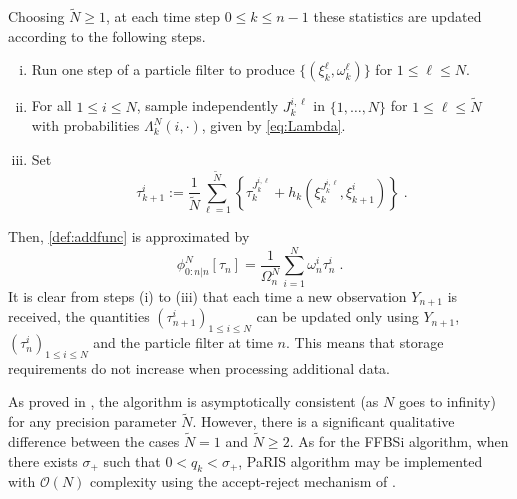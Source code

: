 \documentclass[12pt]{article}
\newcommand{\eqsp}{\;}
\newcommand{\1}{\mathrm{1}}
\newcommand{\qk}{q_{k}}
\begin{document}
Choosing $\tilde{N}\ge 1$, at each time step $0\le k \le {n-1}$ these statistics are updated according to the following steps.
\begin{enumerate}[(i)]
\item \label{it:PaRIS:filt} Run one step of a particle filter to produce $\{(\xi^{\ell}_k, \omega^{\ell}_k)\}$ for $1\le \ell \le N$.
\item \label{it:PaRIS:sampleindex} For all $1\le i \le N$, sample independently $J_{k}^{i,\ell}$ in $\{1,\ldots,N\}$ for $1\le \ell \le \widetilde N$ with probabilities $\Lambda_{k}^N(i,\cdot)$, given by \eqref{eq:Lambda}.
\item \label{it:PaRIS:smooth} Set
\[
\tau^{i}_{k+1} := \frac{1}{\widetilde{N}} \sum^{\widetilde{N}}_{\ell=1} \left\{ \tau^{J_{k}^{i,\ell}}_{k} + h_{k} \left(\xi^{J_{k}^{i,\ell}}_{k}, \xi^{i}_{k+1}\right)  \right\}\eqsp.
\]
\end{enumerate}
Then, \eqref{def:addfunc} is approximated by
\[
\phi_{0:n\vert n}^N[\tau_n] = \frac{1}{\Omega_n^N}\sum_{i=1}^N \omega^{i}_n \tau_n^i\eqsp.
\] 
It is clear from steps (i) to (iii) that each time a new observation $Y_{n+1}$ is received, the quantities $(\tau_{n+1}^i)_{1\le i \le N}$ can be updated only using $Y_{n+1}$, $(\tau_n^i)_{1\le i \le N}$ and the particle filter at time $n$. This means that storage requirements do not increase when processing additional data.

As proved in \cite{olsson:westerborn:2016}, the algorithm is asymptotically consistent (as $N$ goes to infinity) for any precision parameter $\tilde N$. 
However, there is a significant qualitative difference between the cases $\tilde{N} = 1$ and $\tilde{N} \geq 2$. 
As for the FFBSi algorithm,  when there exists $\sigma_+$ such that $0<\qk <\sigma_+$, PaRIS algorithm may be implemented with $\mathcal{O}(N)$ complexity using the accept-reject mechanism of \cite{douc:garivier:moulines:olsson:2011}.
\end{document}
